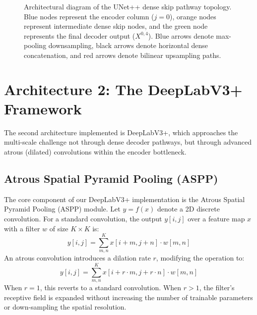 \begin{figure}[H]
    \caption{Architectural diagram of the UNet++ dense skip pathway topology. Blue nodes represent the encoder column ($j=0$), orange nodes represent intermediate dense skip nodes, and the green node represents the final decoder output ($X^{0,4}$). Blue arrows denote max-pooling downsampling, black arrows denote horizontal dense concatenation, and red arrows denote bilinear upsampling paths.}
    \label{fig:unetpp_architecture}
\end{figure}

\section{Architecture 2: The DeepLabV3+ Framework}
The second architecture implemented is DeepLabV3+, which approaches the multi-scale challenge not through dense decoder pathways, but through advanced atrous (dilated) convolutions within the encoder bottleneck. 

\subsection{Atrous Spatial Pyramid Pooling (ASPP)}
The core component of our DeepLabV3+ implementation is the Atrous Spatial Pyramid Pooling (ASPP) module. Let $y = f(x)$ denote a 2D discrete convolution. For a standard convolution, the output $y[i,j]$ over a feature map $x$ with a filter $w$ of size $K \times K$ is:
\begin{equation}
    y[i,j] = \sum_{m,n}^{K} x[i+m, j+n] \cdot w[m,n]
\end{equation}
An atrous convolution introduces a dilation rate $r$, modifying the operation to:
\begin{equation}
    y[i,j] = \sum_{m,n}^{K} x[i+r \cdot m, j+r \cdot n] \cdot w[m,n]
\end{equation}
When $r=1$, this reverts to a standard convolution. When $r>1$, the filter's receptive field is expanded without increasing the number of trainable parameters or down-sampling the spatial resolution.

